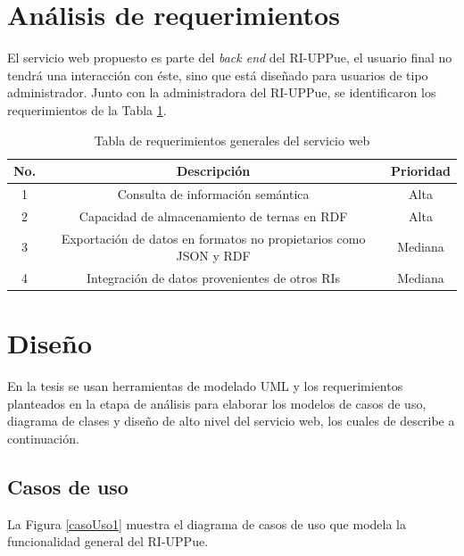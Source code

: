 \section{An\'alisis de requerimientos}

El servicio web propuesto es parte del \emph{back end} del RI-UPPue,  el usuario final no tendr\'a una interacci\'on con \'este, sino que est\'a dise\~{n}ado para usuarios de tipo administrador. Junto con la administradora del RI-UPPue, se identificaron los requerimientos de la Tabla \ref{tablaRequerimientos}. 

\begin{table}[htbp]
    \begin{center}
    \caption{Tabla de requerimientos generales del servicio web}
    \begin{tabular}{|c|c|c|}
    \hline
    \centering \textbf{No. } & \textbf{Descripci\'on} & \textbf{Prioridad} \\
    \hline \hline
    1 & Consulta de informaci\'on sem\'antica & Alta  \\ \hline
    2 & Capacidad de almacenamiento de ternas en RDF & Alta  \\ \hline
    3 & Exportaci\'on de datos en formatos no propietarios como JSON y RDF & Mediana  \\ \hline
    4 & Integraci\'on de datos provenientes de otros RIs & Mediana  \\ \hline
    \end{tabular}
    \label{tablaRequerimientos}
    \end{center}
\end{table}

\section{Dise\~{n}o}

En la tesis se usan herramientas de modelado UML y los requerimientos planteados en la etapa de an\'alisis para elaborar los modelos de casos de uso, diagrama de clases y dise\~{n}o de alto nivel del servicio web, los cuales de describe a continuaci\'on.


\subsection{Casos de uso}

La Figura \ref{casoUso1} muestra el diagrama de casos de uso que modela la funcionalidad general del RI-UPPue.

